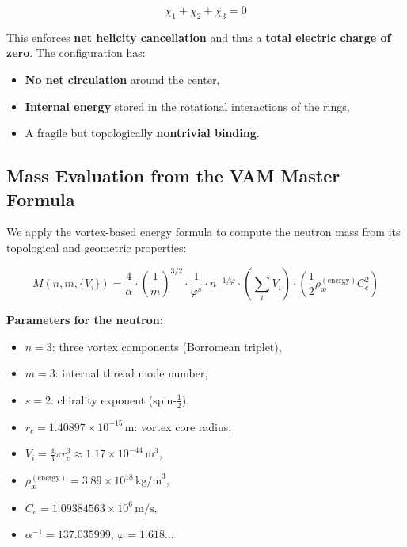 \[
\chi_1 + \chi_2 + \chi_3 = 0
\]

This enforces \textbf{net helicity cancellation} and thus a \textbf{total electric charge of zero}. The configuration has:

\begin{itemize}
    \item \textbf{No net circulation} around the center,
    \item \textbf{Internal energy} stored in the rotational interactions of the rings,
    \item A fragile but topologically \textbf{nontrivial binding}.
\end{itemize}

\subsection{Mass Evaluation from the VAM Master Formula}

We apply the vortex-based energy formula to compute the neutron mass from its topological and geometric properties:

\begin{equation}
\boxed{
M(n, m, \{V_i\}) = \frac{4}{\alpha} \cdot \left( \frac{1}{m} \right)^{3/2} \cdot \frac{1}{\varphi^s} \cdot n^{-1/\varphi} \cdot \left( \sum_i V_i \right) \cdot \left( \frac{1}{2} \rho_\text{\ae}^{(\text{energy})} C_e^2 \right)
}
\end{equation}

\noindent
\textbf{Parameters for the neutron:}
\begin{itemize}
    \item \(n = 3\): three vortex components (Borromean triplet),
    \item \(m = 3\): internal thread mode number,
    \item \(s = 2\): chirality exponent (spin-\(\frac{1}{2}\)),
    \item \(r_c = 1.40897 \times 10^{-15} \, \text{m}\): vortex core radius,
    \item \(V_i = \frac{4}{3} \pi r_c^3 \approx 1.17 \times 10^{-44} \, \text{m}^3\),
    \item \(\rho_\text{\ae}^{(\text{energy})} = 3.89 \times 10^{18} \, \text{kg/m}^3\),
    \item \(C_e = 1.09384563 \times 10^6 \, \text{m/s}\),
    \item \(\alpha^{-1} = 137.035999\), \quad \(\varphi = 1.618...\)
\end{itemize}

